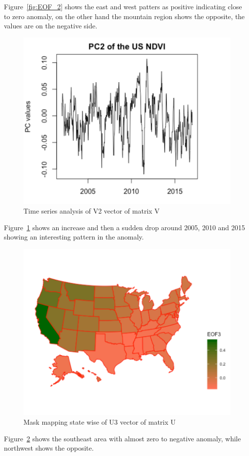      Figure~\ref{fig:EOF_2} shows the east and west patters as positive indicating close to zero anomaly, on the other hand the mountain region shows the opposite, the values are on the negative side.
    
    \begin{figure}[H]
            \centering
            \includegraphics[width=0.70\linewidth]{figures/ch5/SVD/pc2.png}
            \caption{\label{fig:V_2} Time series analysis of V2 vector of matrix V}
    \end{figure}
    
    Figure~\ref{fig:V_2} shows an increase and then a sudden drop around 2005, 2010 and 2015 showing an interesting pattern in the anomaly.
    
     \begin{figure}[H]
            \centering
            \includegraphics[width=0.70\linewidth]{figures/ch5/SVD/eof3.png}
            \caption{\label{fig:EOF_3} Mask mapping state wise of U3 vector of matrix U}
    \end{figure}
    
   Figure~\ref{fig:EOF_3} shows the southeast area with almost zero to negative anomaly, while northwest shows the opposite.
    
